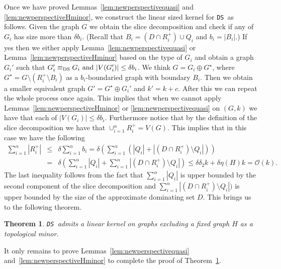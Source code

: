\documentclass[11pt]{article}
\newtheorem{theorem}{Theorem}
\newcommand{\tDS}{{\texttt{\sc DS}}}
\newcommand{\cO}{\mathcal{O}}
\begin{document}
Once we have proved Lemmas~\ref{lem:newperspectivequasi} and \ref{lem:newperspectiveHminor}, 
we construct the linear sized kernel for \tDS \, as follows. Given the graph $G$ we 
obtain the slice decomposition and check if any of $G_i$ has size more than $\delta b_i$. (Recall that 
$B_i=(D \cap R_i^+)\cup Q_i$ and $b_i=|B_i|$.) 
 If yes then we either apply  
Lemma~\ref{lem:newperspectivequasi} or Lemma~\ref{lem:newperspectiveHminor} based on the type of $G_i$ 
and obtain a graph $G_i'$ such that  $G_i' \equiv_{\tDS} G_i \mbox{ and }  |V(G_i')| \leq \delta b_i$. We think 
$G=G_i\oplus G^{\star}$, where $G^{\star}=G\setminus (R_i^{+} \setminus B_i)$ as a $b_i$-boundaried graph with 
boundary $B_i$. Then we obtain  a smaller equivalent graph $G'=G^{\star}\oplus G_i' $ and $k'=k+c$.  After this we can 
repeat the whole process once again. This implies that when we cannot apply Lemmas~\ref{lem:newperspectiveHminor} or  
\ref{lem:newperspectivequasi}  on $(G,k)$ we have that each of 
$|V(G_i)|\leq \delta b_i$.  Furthermore notice that by the definition of the slice decomposition we have that $\cup_{i=1}^{\alpha} R_i^{+}=V(G)$. This implies that in this case we have the 
following
\begin{eqnarray*}
\sum_{i=1}^{\alpha} |R_{i}^+| & \leq & \delta \sum_{i=1}^{\alpha} b_i =  \delta (\sum_{i=1}^{\alpha} (|Q_i|+|(D \cap R_i^+)\setminus Q_i|)) \\
& = &
\delta (\sum_{i=1}^{\alpha} |Q_i| +  \sum_{i=1}^{\alpha} |(D \cap R_i^+)\setminus Q_i|) 
\leq \delta \delta_2 k + \delta \eta(H)k = \cO(k). 
\end{eqnarray*}
The last inequality follows from the fact that $\sum_{i=1}^{\alpha} |Q_i|$ is upper bounded by the second component of the slice decomposition and  $\sum_{i=1}^{\alpha} |(D \cap R_i^+)\setminus Q_i|)$ is upper bounded by the size of the approximate dominating set $D$. This brings us to the following theorem. 
\begin{theorem}
\label{thm:lineardomsettopo}
\tDS \, admits a linear kernel on graphs excluding a fixed graph $H$ as a topological minor. 
\end{theorem}

It only remains to prove Lemmas~\ref{lem:newperspectivequasi} and~\ref{lem:newperspectiveHminor} to complete the proof of 
Theorem~\ref{thm:lineardomsettopo}. 
\end{document}
